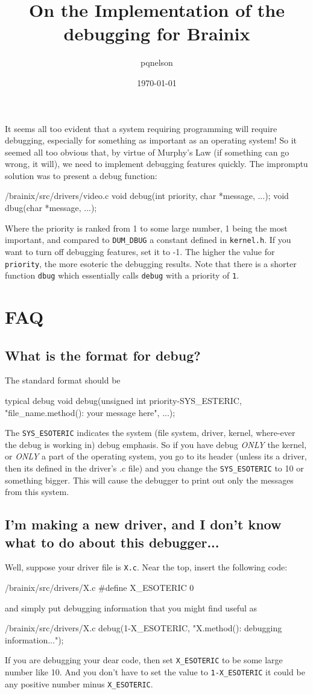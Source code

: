 \documentclass{article}
\title{On the Implementation of the debugging for Brainix}
\author{pqnelson}
\date{\today}
\begin{document}
\maketitle

It seems all too evident that a system requiring programming will require debugging, especially for something as important as an operating system! So it seemed all too obvious that, by virtue of Murphy's Law (if something can go wrong, it will), we need to implement debugging features quickly. The impromptu solution was to present a debug function:
\begin{code}{/brainix/src/drivers/video.c}
void debug(int priority, char *message, ...);
void dbug(char *message, ...);
\end{code}
Where the priority is ranked from 1 to some large number, 1 being the most important, and compared to \verb|DUM_DBUG| a constant defined in \verb|kernel.h|. If you want to turn off debugging features, set it to -1. The higher the value for \verb|priority|, the more esoteric the debugging results. Note that there is a shorter function \verb|dbug| which essentially calls \verb|debug| with a priority of \verb|1|.
\section{FAQ}
\subsection{What is the format for debug?}
The standard format should be
\begin{code}{typical debug}
void debug(unsigned int priority-SYS_ESTERIC, "file_name.method(): your message here", ...);
\end{code}
The \verb|SYS_ESOTERIC| indicates the system (file system, driver, kernel, where-ever the debug is working in) debug emphasis. So if you have debug \emph{ONLY} the kernel, or \emph{ONLY} a part of the operating system, you go to its header (unless its a driver, then its defined in the driver's .c file) and you change the \verb|SYS_ESOTERIC| to 10 or something bigger. This will cause the debugger to print out only the messages from this system.
\subsection{I'm making a new driver, and I don't know what to do about this debugger...}
Well, suppose your driver file is \verb|X.c|. Near the top, insert the following code:
\begin{code}{/brainix/src/drivers/X.c}
 #define X_ESOTERIC     0
\end{code}
and simply put debugging information that you might find useful as
\begin{code}{/brainix/src/drivers/X.c}
     debug(1-X_ESOTERIC, "X.method(): debugging information...");
\end{code}
If you are debugging your dear code, then set \verb|X_ESOTERIC| to be some large number like 10. And you don't have to set the value to \verb|1-X_ESOTERIC| it could be any positive number minus \verb|X_ESOTERIC|.
\end{document}
